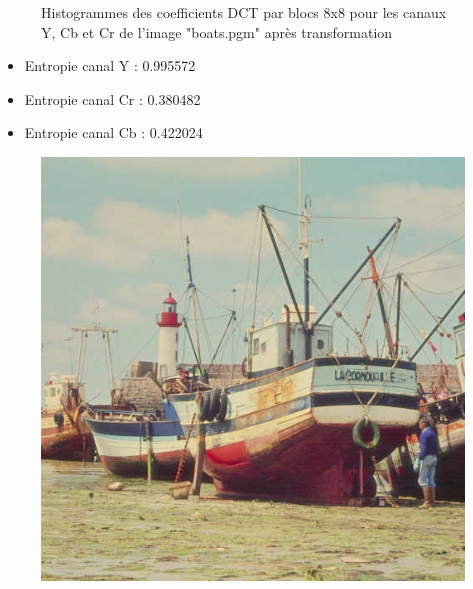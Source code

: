 \documentclass[12pt]{report}
\begin{document}
\begin{figure}[H]
\begin{center}
\caption{Histogrammes des coefficients DCT par blocs 8x8 pour les canaux Y, Cb et Cr de l'image "boats.pgm" après transformation}
\end{center}
\end{figure}

\begin{itemize}
\item Entropie canal Y : 0.995572
\item Entropie canal Cr : 0.380482
\item Entropie canal Cb : 0.422024
\end{itemize}

\begin{figure}[H]
\begin{center}
\includegraphics[scale=0.4]{../ImageRes/blockidct_transform_result.jpg} 

\end{center}
\end{figure}
\end{document}

